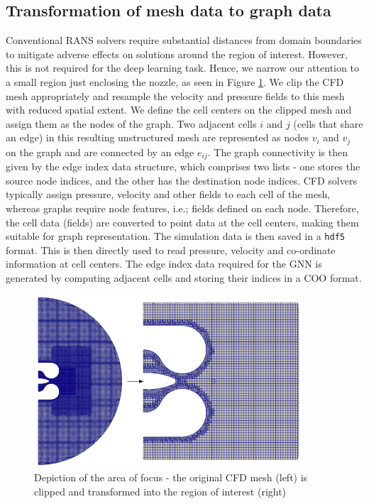 \subsection{Transformation of mesh data to graph data}
Conventional RANS solvers require substantial distances from domain boundaries to mitigate adverse effects on solutions around the region of interest. However, this is not required for the deep learning task. Hence, we narrow our attention to a small region just enclosing the nozzle, as seen in Figure \ref{clipmesh}. We clip the CFD mesh appropriately and resample the velocity and pressure fields to this mesh with reduced spatial extent. We define the cell centers on the clipped mesh and assign them as the nodes of the graph. Two adjacent cells $i$ and $j$ (cells that share an edge) in this resulting unstructured mesh are represented as nodes $v_i$ and $v_j$ on the graph and are connected by an edge $e_{ij}$. The graph connectivity is then given by the edge index data structure, which comprises two lists - one stores the source node indices, and the other has the destination node indices. CFD solvers typically assign pressure, velocity and other fields to each cell of the mesh, whereas graphs require node features, i.e.; fields defined on each node. Therefore, the cell data (fields) are converted to point data at the cell centers, making them suitable for graph representation. The simulation data is then saved in a \verb|hdf5| format. This is then directly used to read pressure, velocity and co-ordinate information at cell centers. 
The edge index data required for the GNN is generated by computing adjacent cells and storing their indices in a \gls{COO} format. 
\begin{figure}[ht]
    \centering
    \includegraphics[width=10cm]{images/Methodology/Clipped.png}
    \caption{Depiction of the area of focus - the original CFD mesh (left) is clipped and transformed into the region of interest (right)}
    \label{clipmesh}
\end{figure}
